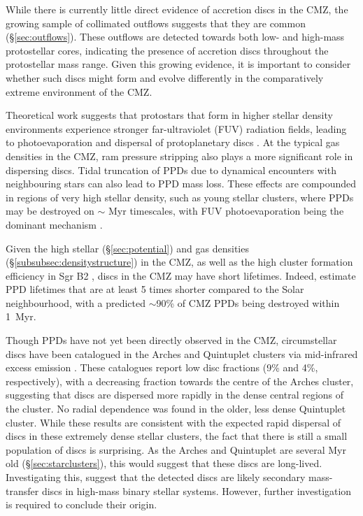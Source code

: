 While there is currently little direct evidence of accretion discs in the CMZ, the growing sample of collimated outflows suggests that they are common (\S \ref{sec:outflows}). These outflows are detected towards both low- and high-mass protostellar cores, indicating the presence of accretion discs throughout the protostellar mass range. Given this growing evidence, it is important to consider whether such discs might form and evolve differently in the comparatively extreme environment of the CMZ. 

Theoretical work suggests that protostars that form in higher stellar density environments experience stronger far-ultraviolet (FUV) radiation fields, leading to photoevaporation and dispersal of protoplanetary discs \citep[PPDs,][]{Winter2018, Winter2020}. At the typical gas densities in the CMZ, ram pressure stripping also plays a more significant role in dispersing discs.
Tidal truncation of PPDs due to dynamical encounters with neighbouring stars can also lead to PPD mass loss. These effects are compounded in regions of very high stellar density, such as young stellar clusters, where PPDs may be destroyed on $\sim$ Myr timescales, with FUV photoevaporation being the dominant mechanism \citep[e.g.][and references therein]{Winter2018}. 

Given the high stellar (\S \ref{sec:potential}) and gas densities (\S \ref{subsubsec:densitystructure}) in the CMZ, as well as the high cluster formation efficiency in Sgr B2 \citep{Ginsburg2018a}, discs in the CMZ may have short lifetimes.
Indeed, \citet{Winter2020} estimate PPD lifetimes that are at least 5 times shorter compared to the Solar neighbourhood, with a predicted $\sim$90\% of CMZ PPDs being destroyed within 1~Myr.

Though PPDs have not yet been directly observed in the CMZ, circumstellar discs have been catalogued in the Arches and Quintuplet clusters via mid-infrared excess emission \citep{Stolte2010, Stolte2015}. These catalogues report low disc fractions (9\% and 4\%, respectively), with a decreasing fraction towards the centre of the Arches cluster, suggesting that discs are dispersed more rapidly in the dense central regions of the cluster. No radial dependence was found in the older, less dense Quintuplet cluster. While these results are consistent with the expected rapid dispersal of discs in these extremely dense stellar clusters, the fact that there is still a small population of discs is surprising. As the Arches and Quintuplet are several Myr old (\S\ref{sec:starclusters}), this would suggest that these discs are long-lived. Investigating this, \citet{Stolte2015} suggest that the detected discs are likely secondary mass-transfer discs in high-mass binary stellar systems. However, further investigation is required to conclude their origin.

